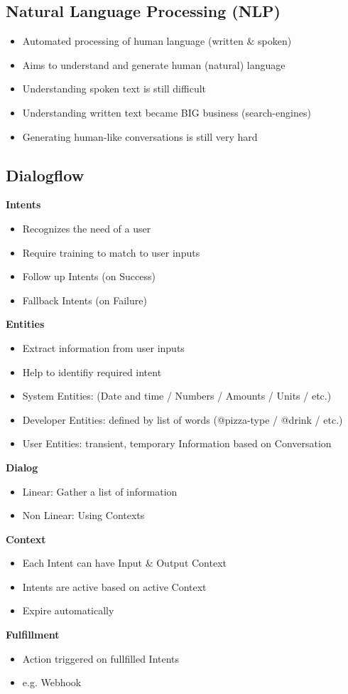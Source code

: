 \subsection{Natural Language Processing (NLP)}
\begin{itemize}
    \item Automated processing of human language (written \& spoken)
    \item Aims to understand and generate human (natural) language
    \item Understanding spoken text is still difficult
    \item Understanding written text became BIG business (search-engines)
    \item Generating human-like conversations is still very hard
\end{itemize}

\subsection{Dialogflow}
\textbf{Intents}
\begin{itemize}
    \item Recognizes the need of a user
    \item Require training to match to user inputs
    \item Follow up Intents (on Success)
    \item Fallback Intents (on Failure)
\end{itemize}
\textbf{Entities}
\begin{itemize}
    \item Extract information from user inputs
    \item Help to identifiy required intent
    \item System Entities: (Date and time / Numbers / Amounts / Units / etc.)
    \item Developer Entities: defined by list of words (@pizza-type / @drink / etc.)
    \item User Entities: transient, temporary Information based on Conversation
\end{itemize}
\textbf{Dialog}
\begin{itemize}
    \item Linear: Gather a list of information
    \item Non Linear: Using Contexts
\end{itemize}
\textbf{Context}
\begin{itemize}
    \item Each Intent can have Input \& Output Context
    \item Intents are active based on active Context
    \item Expire automatically
\end{itemize}
\textbf{Fulfillment}
\begin{itemize}
    \item Action triggered on fullfilled Intents
    \item e.g. Webhook
\end{itemize}

